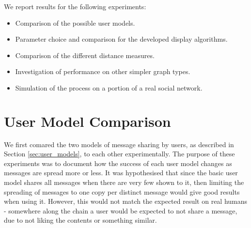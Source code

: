 \documentclass[bsc,frontabs,twoside,singlespacing,parskip,deptreport]{infthesis}     %
\begin{document}
We report results for the following experiments:
\begin{itemize}
\item Comparison of the possible user models.
\item Parameter choice and comparison for the developed display algorithms.
\item Comparison of the different distance measures.
\item Investigation of performance on other simpler graph types.
\item Simulation of the process on a portion of a real social network.
\end{itemize}

\section{User Model Comparison} \label{sec:user_model_comparison}
We first comared the two models of message sharing by users, as described in Section \ref{sec:user_models}, to each other experimentally. The purpose of these experiments was to document how the success of each user model changes as messages are spread more or less. It was hypothesised that since the basic user model shares all messages when there are very few shown to it, then limiting the spreading of messages to one copy per distinct message would give good results when using it. However, this would not match the expected result on real humans - somewhere along the chain a user would be expected to not share a message, due to not liking the contents or something similar.
\end{document}
